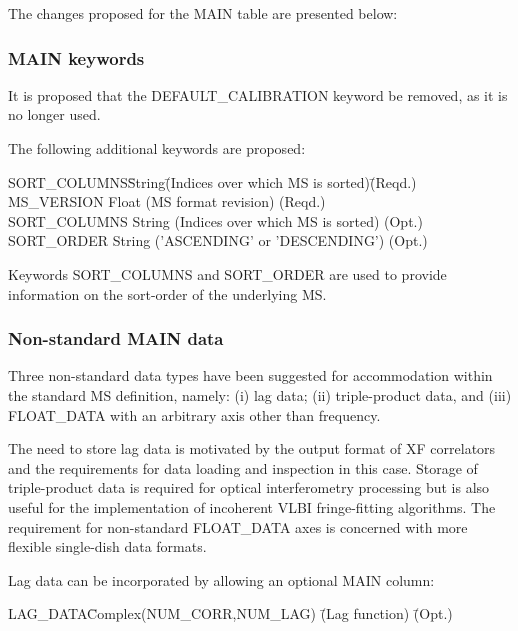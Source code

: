 \documentclass{article}
\begin{document}
The changes proposed for the MAIN table are presented below:

\subsubsection{MAIN keywords}

It is proposed that the DEFAULT\_CALIBRATION keyword be removed, as it
is no longer used. 

The following additional keywords are proposed:

\begin{tabbing}
SORT\_COLUMNS\quad\quad  \= String\quad\quad  \=
(Indices over which MS is sorted)\quad\quad \= (Reqd.) \kill
MS\_VERSION \> Float \> (MS format revision) \> (Reqd.) \\
SORT\_COLUMNS  \> String  \> (Indices over which MS is sorted) \> (Opt.) \\
SORT\_ORDER \> String \> ('ASCENDING' or 'DESCENDING') \> (Opt.) \\
\end{tabbing}

 Keywords SORT\_COLUMNS and SORT\_ORDER are used to provide
information on the sort-order of the underlying MS.

\subsubsection{Non-standard MAIN data}

Three non-standard data types have been suggested for accommodation
within the standard MS definition, namely: (i) lag data; (ii)
triple-product data, and (iii) FLOAT\_DATA with an arbitrary axis other
than frequency.

The need to store lag data is motivated by the output format of XF
correlators and the requirements for data loading and inspection in
this case. Storage of triple-product data is required for optical
interferometry processing but is also useful for the implementation of
incoherent VLBI fringe-fitting algorithms. The requirement for
non-standard FLOAT\_DATA axes is concerned with more flexible
single-dish data formats.

Lag data can be incorporated by allowing an optional MAIN column:

\begin{tabbing}
LAG\_DATA\quad\quad \= Complex(NUM\_CORR,NUM\_LAG) \quad\quad \= 
(Lag function) \quad\quad \= (Opt.) \\
\end{tabbing}
\end{document}
